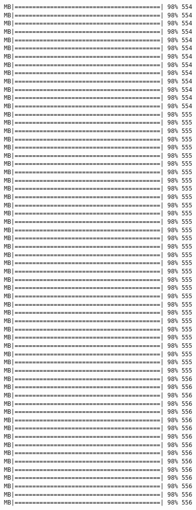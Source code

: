 \documentclass[
]{article}
\begin{document}
\begin{verbatim}
MB|=========================================| 98% 554 MB|=========================================| 98% 554 MB|=========================================| 98% 554 MB|=========================================| 98% 554 MB|=========================================| 98% 554 MB|=========================================| 98% 554 MB|=========================================| 98% 554 MB|=========================================| 98% 554 MB|=========================================| 98% 554 MB|=========================================| 98% 554 MB|=========================================| 98% 554 MB|=========================================| 98% 554 MB|=========================================| 98% 554 MB|=========================================| 98% 555 MB|=========================================| 98% 555 MB|=========================================| 98% 555 MB|=========================================| 98% 555 MB|=========================================| 98% 555 MB|=========================================| 98% 555 MB|=========================================| 98% 555 MB|=========================================| 98% 555 MB|=========================================| 98% 555 MB|=========================================| 98% 555 MB|=========================================| 98% 555 MB|=========================================| 98% 555 MB|=========================================| 98% 555 MB|=========================================| 98% 555 MB|=========================================| 98% 555 MB|=========================================| 98% 555 MB|=========================================| 98% 555 MB|=========================================| 98% 555 MB|=========================================| 98% 555 MB|=========================================| 98% 555 MB|=========================================| 98% 555 MB|=========================================| 98% 555 MB|=========================================| 98% 555 MB|=========================================| 98% 555 MB|=========================================| 98% 555 MB|=========================================| 98% 555 MB|=========================================| 98% 555 MB|=========================================| 98% 555 MB|=========================================| 98% 555 MB|=========================================| 98% 555 MB|=========================================| 98% 555 MB|=========================================| 98% 555 MB|=========================================| 98% 556 MB|=========================================| 98% 556 MB|=========================================| 98% 556 MB|=========================================| 98% 556 MB|=========================================| 98% 556 MB|=========================================| 98% 556 MB|=========================================| 98% 556 MB|=========================================| 98% 556 MB|=========================================| 98% 556 MB|=========================================| 98% 556 MB|=========================================| 98% 556 MB|=========================================| 98% 556 MB|=========================================| 98% 556 MB|=========================================| 98% 556 MB|=========================================| 98% 556 MB|=========================================| 98% 556 
\end{verbatim}
\end{document}
